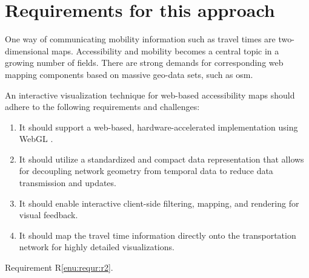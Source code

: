 
\cleardoublepage              %
\chapter{Requirements for this approach}
  \label{chap:requr}

  One way of communicating mobility information such as travel times are
  two-dimensional maps. Accessibility and mobility becomes a central topic in a
  growing number of fields. There are strong demands for corresponding web
  mapping components based on massive geo-data sets, such as \acrshort{osm}.\par

  An interactive visualization technique for web-based accessibility maps should
  adhere to the following requirements and challenges:\par

  \begin{enumerate}[\label=({R}1)]
    \item \label{enu:requr:r1} It should support a web-based,
      hardware-accelerated implementation using WebGL \cite{Parisi2012}.
    \item \label{enu:requr:r2} It should utilize a standardized and compact
      data representation that allows for decoupling network geometry from
      temporal data to reduce data transmission and updates.
    \item \label{enu:requr:r3} It should enable interactive client-side
      filtering, mapping, and rendering for visual feedback.
    \item \label{enu:requr:r4} It should map the travel time information
      directly onto the transportation network for highly detailed
      visualizations.
  \end{enumerate}

  Requirement R\ref{enu:requr:r2}.

